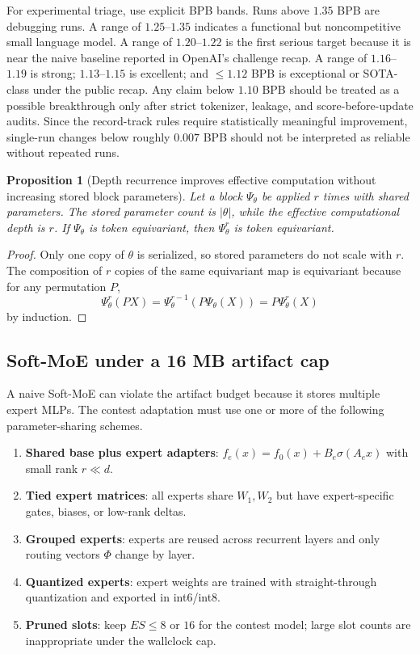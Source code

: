 \documentclass[11pt]{article}
\theoremstyle{definition}
\theoremstyle{plain}
\newtheorem{proposition}[definition]{Proposition}
\theoremstyle{remark}
\numberwithin{equation}{section}
\begin{document}
For experimental triage, use explicit BPB bands.  Runs above $1.35$ BPB are debugging runs.  A range of $1.25$--$1.35$ indicates a functional but noncompetitive small language model.  A range of $1.20$--$1.22$ is the first serious target because it is near the naive baseline reported in OpenAI's challenge recap.  A range of $1.16$--$1.19$ is strong; $1.13$--$1.15$ is excellent; and $\le1.12$ BPB is exceptional or SOTA-class under the public recap.  Any claim below $1.10$ BPB should be treated as a possible breakthrough only after strict tokenizer, leakage, and score-before-update audits.  Since the record-track rules require statistically meaningful improvement, single-run changes below roughly $0.007$ BPB should not be interpreted as reliable without repeated runs.

\begin{proposition}[Depth recurrence improves effective computation without increasing stored block parameters]
Let a block $\Psi_\theta$ be applied $r$ times with shared parameters.  The stored parameter count is $|\theta|$, while the effective computational depth is $r$.  If $\Psi_\theta$ is token equivariant, then $\Psi_\theta^r$ is token equivariant.
\end{proposition}

\begin{proof}
Only one copy of $\theta$ is serialized, so stored parameters do not scale with $r$.  The composition of $r$ copies of the same equivariant map is equivariant because for any permutation $P$,
\begin{equation}
  \Psi_\theta^r(PX)=\Psi_\theta^{r-1}(P\Psi_\theta(X))=P\Psi_\theta^r(X)
\end{equation}
by induction.
\end{proof}

\subsection{Soft-MoE under a 16 MB artifact cap}

A naive Soft-MoE can violate the artifact budget because it stores multiple expert MLPs.  The contest adaptation must use one or more of the following parameter-sharing schemes.
\begin{enumerate}[leftmargin=2em]
  \item \textbf{Shared base plus expert adapters}: $f_e(x)=f_0(x)+B_e\sigma(A_e x)$ with small rank $r\ll d$.
  \item \textbf{Tied expert matrices}: all experts share $W_1,W_2$ but have expert-specific gates, biases, or low-rank deltas.
  \item \textbf{Grouped experts}: experts are reused across recurrent layers and only routing vectors $\Phi$ change by layer.
  \item \textbf{Quantized experts}: expert weights are trained with straight-through quantization and exported in int6/int8.
  \item \textbf{Pruned slots}: keep $E S\le8$ or $16$ for the contest model; large slot counts are inappropriate under the wallclock cap.
\end{enumerate}
\end{document}
